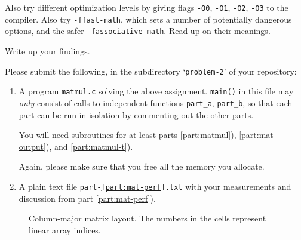 \documentclass[11pt]{article}
\begin{document}
\begin{enumerate}[a)]
  Also try different optimization levels by giving flags \texttt{-O0},
  \texttt{-O1}, \texttt{-O2}, \texttt{-O3} to the compiler.  Also try
  \texttt{-ffast-math}, which sets a number of potentially dangerous
  options, and the safer \texttt{-fassociative-math}.  Read up on
  their meanings.

  Write up your findings.
\end{enumerate}

Please submit the following, in the subdirectory `\texttt{problem-2}'
of your repository:
\begin{enumerate}
  \item A program \texttt{matmul.c} solving the above assignment.
  \texttt{main()} in this file may \emph{only} consist of calls to
  independent functions \verb|part_a|, \verb|part_b|, so that each
  part can be run in isolation by commenting out the other parts.

  You will need subroutines for at least parts \ref{part:matmul}),
  \ref{part:mat-output}), and \ref{part:matmul-t}).

  Again, please make sure that you free all the memory you allocate.
  \item A plain text file \texttt{part-\ref{part:mat-perf}.txt}
  with your measurements and discussion from part
  \ref{part:mat-perf}).
\end{enumerate}

\begin{figure}

\begin{center}
\end{center}

\caption{Column-major matrix layout. The numbers in the cells
represent linear array indices.}
\label{fig:column-major}
\end{figure}
\end{document}
